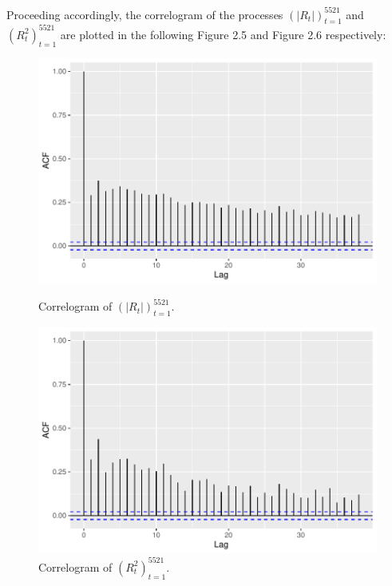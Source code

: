 Proceeding accordingly, the correlogram of the processes $(|R_{t}|)_{t=1}^{5521}$ and $(R_{t}^{2})_{t=1}^{5521}$ are plotted in the following Figure 2.5 and Figure 2.6 respectively:
\begin{figure}[H]
\begin{minipage}[b]{0.45\linewidth}
\centering
\includegraphics[width=1.2\linewidth, height=0.3\textheight]{fig/img/acfabsret.pdf}
\caption{Correlogram of $(|R_{t}|)_{t=1}^{5521}$.}
\label{fig:ACF1}
\end{minipage}
\hspace{0.7cm}
\begin{minipage}[b]{0.45\linewidth}
\centering
\includegraphics[width=1.2\linewidth, height=0.3\textheight]{fig/img/acfsquaredret.pdf}
\caption{Correlogram of $(R_{t}^{2})_{t=1}^{5521}$.}
\label{fig:ACF2}
\end{minipage}
\end{figure}
